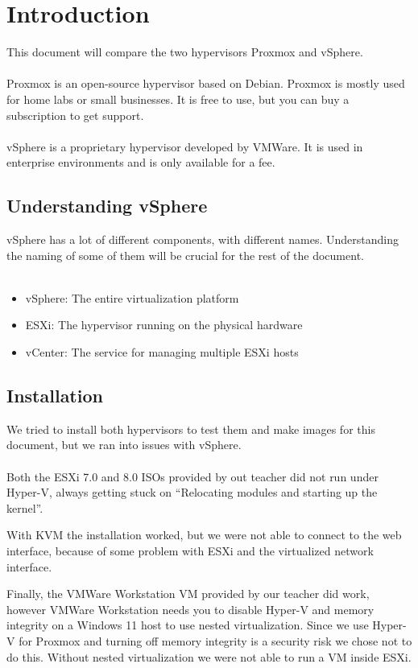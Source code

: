 \section{Introduction}
This document will compare the two hypervisors Proxmox and vSphere.
\\\\
Proxmox is an open-source hypervisor based on Debian. Proxmox is mostly used for home labs or small businesses. It is free to use, but you can buy a subscription to get support.
\\\\
vSphere is a proprietary hypervisor developed by VMWare. It is used in enterprise environments and is only available for a fee.

\subsection{Understanding vSphere}

vSphere has a lot of different components, with different names. Understanding the naming of some of them will be crucial for the rest of the document.
\\\\
\begin{itemize}
	\item vSphere: The entire virtualization platform
	\item ESXi: The hypervisor running on the physical hardware
	\item vCenter: The service for managing multiple ESXi hosts
\end{itemize}

\subsection{Installation}

We tried to install both hypervisors to test them and make images for this document, but we ran into issues with vSphere.
\\\\
Both the ESXi 7.0 and 8.0 ISOs provided by out teacher did not run under Hyper-V, always getting stuck on ``Relocating modules and starting up the kernel''.

With KVM the installation worked, but we were not able to connect to the web interface, because of some problem with ESXi and the virtualized network interface.

Finally, the VMWare Workstation VM provided by our teacher did work, however VMWare Workstation needs you to disable Hyper-V and memory integrity on a Windows 11 host to use nested virtualization. Since we use Hyper-V for Proxmox and turning off memory integrity is a security risk we chose not to do this. Without nested virtualization we were not able to run a VM inside ESXi.